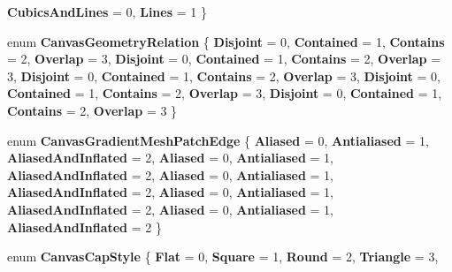 \begin{DoxyCompactItemize}
{\bfseries Cubics\+And\+Lines} = 0, 
{\bfseries Lines} = 1
 \}
\item 
\mbox{\label{namespace_microsoft_1_1_graphics_1_1_canvas_1_1_geometry_abb27c8fb8d2b8f00eb3225ac6f3531e3}} 
enum {\bfseries Canvas\+Geometry\+Relation} \{ \newline
{\bfseries Disjoint} = 0, 
{\bfseries Contained} = 1, 
{\bfseries Contains} = 2, 
{\bfseries Overlap} = 3, 
\newline
{\bfseries Disjoint} = 0, 
{\bfseries Contained} = 1, 
{\bfseries Contains} = 2, 
{\bfseries Overlap} = 3, 
\newline
{\bfseries Disjoint} = 0, 
{\bfseries Contained} = 1, 
{\bfseries Contains} = 2, 
{\bfseries Overlap} = 3, 
\newline
{\bfseries Disjoint} = 0, 
{\bfseries Contained} = 1, 
{\bfseries Contains} = 2, 
{\bfseries Overlap} = 3, 
\newline
{\bfseries Disjoint} = 0, 
{\bfseries Contained} = 1, 
{\bfseries Contains} = 2, 
{\bfseries Overlap} = 3
 \}
\item 
\mbox{\label{namespace_microsoft_1_1_graphics_1_1_canvas_1_1_geometry_ad355c607a325a3422031f9e574b3dd1b}} 
enum {\bfseries Canvas\+Gradient\+Mesh\+Patch\+Edge} \{ \newline
{\bfseries Aliased} = 0, 
{\bfseries Antialiased} = 1, 
{\bfseries Aliased\+And\+Inflated} = 2, 
{\bfseries Aliased} = 0, 
\newline
{\bfseries Antialiased} = 1, 
{\bfseries Aliased\+And\+Inflated} = 2, 
{\bfseries Aliased} = 0, 
{\bfseries Antialiased} = 1, 
\newline
{\bfseries Aliased\+And\+Inflated} = 2, 
{\bfseries Aliased} = 0, 
{\bfseries Antialiased} = 1, 
{\bfseries Aliased\+And\+Inflated} = 2, 
\newline
{\bfseries Aliased} = 0, 
{\bfseries Antialiased} = 1, 
{\bfseries Aliased\+And\+Inflated} = 2
 \}
\item 
\mbox{\label{namespace_microsoft_1_1_graphics_1_1_canvas_1_1_geometry_aceede6fdba7f9ce2af9afb615db0aebf}} 
enum {\bfseries Canvas\+Cap\+Style} \{ \newline
{\bfseries Flat} = 0, 
{\bfseries Square} = 1, 
{\bfseries Round} = 2, 
{\bfseries Triangle} = 3, 
\newline

\end{DoxyCompactItemize}
